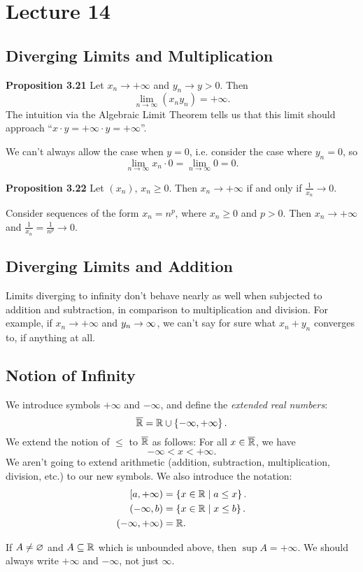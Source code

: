 \documentclass[class=article, crop=false]{standalone}
\begin{document}
  \section{Lecture 14}
  \subsection{Diverging Limits and Multiplication}
  \textbf{Proposition 3.21} Let $x_n\to+\infty$ and $y_n\to y > 0$. Then
  \[
    \lim_{n\to \infty} (x_ny_n) = +\infty.
  \]
  The intuition via the Algebraic Limit Theorem tells us that this limit should approach ``$x\cdot y = +\infty\cdot y = +\infty$''.
  \begin{note}{}
    We can't always allow the case when $y = 0$, i.e. consider the case where $y_n = 0$, so 
    \[
      \lim_{n\to \infty} x_n\cdot 0 = \lim_{n\to \infty} 0 = 0.
    \]
  \end{note}
  \textbf{Proposition 3.22} Let $(x_n)$, $x_n\geq 0$. Then $x_n\to+\infty$ if and only if $\frac{1}{x_n}\to 0$.
  \begin{example}{}
    Consider sequences of the form $x_n = n^p$, where $x_n\geq 0$ and $p > 0$. Then $x_n\to+\infty$ and $\frac{1}{x_n} = \frac{1}{n^p}\to 0$.
  \end{example}
  \subsection{Diverging Limits and Addition}
  \begin{note}{}
    Limits diverging to infinity don't behave nearly as well when subjected to addition and subtraction, in comparison to multiplication and division. For example, if $x_n\to+\infty$ and $y_n\to\-\infty$, we can't say for sure what $x_n + y_n$ converges to, if anything at all. \par
  \end{note}
  \subsection{Notion of Infinity}
  We introduce symbols $+\infty$ and $-\infty$, and define the \emph{extended real numbers}:
  \[
    \overline{\mathbb{R}} = \mathbb{R}\cup \left\{-\infty, +\infty\right\}.
  \]
  We extend the notion of $\leq$ to $\overline{\mathbb{R}}$ as follows: For all $x\in\overline{\mathbb{R}}$, we have
  \[
    -\infty < x < +\infty.
  \]
  We aren't going to extend arithmetic (addition, subtraction, multiplication, division, etc.) to our new symbols. We also introduce the notation:
  \begin{align*}
    [a, +\infty) &= \left\{x\in\mathbb{R}\mid a\leq x\right\}. \\
    (-\infty, b) &= \left\{x\in\mathbb{R}\mid x\leq b\right\}. \\
    (-\infty, +\infty) &= \mathbb{R}.
  \end{align*}
  \begin{note}{}
    If $A\neq \varnothing$ and $A\subseteq\mathbb{R}$ which is unbounded above, then $\sup A = +\infty$. We should always write $+\infty$ and $-\infty$, not just $\infty$.
  \end{note}
\end{document}
